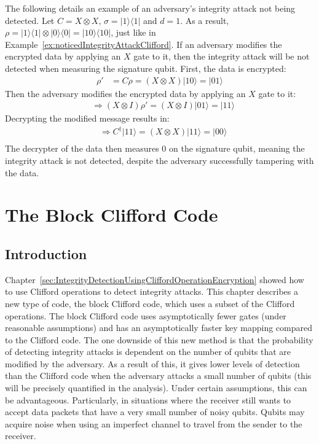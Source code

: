 \begin{example}
\label{ex:unnoticedIntegrityAttackClifford}
		The following details an example of an adversary's integrity attack not being detected. Let $C = X \otimes X$, $\sigma = |1\rangle\langle1|$ and $d = 1$. As a result, $\rho = |1\rangle\langle1| \otimes |0\rangle\langle0| = |10\rangle\langle10|$, just like in Example~\ref{ex:noticedIntegrityAttackClifford}. If an adversary modifies the encrypted data by applying an $X$ gate to it, then the integrity attack will be not detected when measuring the signature qubit. First, the data is encrypted:
	\begin{align}
	\rho' &= C\rho = (X \otimes X)|10\rangle = |01\rangle
	\end{align}
    Then the adversary modifies the encrypted data by applying an $X$ gate to it:
	\begin{align}
	& \Rightarrow (X \otimes I) \rho' = (X \otimes I) |01\rangle = |11\rangle
	\end{align}
	Decrypting the modified message results in:
	\begin{align}
	& \Rightarrow C^{\dagger}|11\rangle = (X \otimes X)|11\rangle = |00\rangle\\
	\end{align}
	The decrypter of the data then measures $0$ on the signature qubit, meaning the integrity attack is not detected, despite the adversary successfully tampering with the data. 
\end{example}

\pagebreak
\chapter{The Block Clifford Code}
\label{sec:PerezCode}
\section{Introduction}
Chapter~\ref{sec:IntegrityDetectionUsingCliffordOperationEncryption} showed how to use Clifford operations to detect integrity attacks. This chapter describes a new type of code, the block Clifford code, which uses a subset of the Clifford operations. The block Clifford code uses asymptotically fewer gates (under reasonable assumptions) and has an asymptotically faster key mapping compared to the Clifford code. The one downside of this new method is that the probability of detecting integrity attacks is dependent on the number of qubits that are modified by the adversary. As a result of this, it gives lower levels of detection than the Clifford code when the adversary attacks a small number of qubits (this will be precisely quantified in the analysis). Under certain assumptions, this can be advantageous. Particularly, in situations where the receiver still wants to accept data packets that have a very small number of noisy qubits. Qubits may acquire noise when using an imperfect channel to travel from the sender to the receiver.

